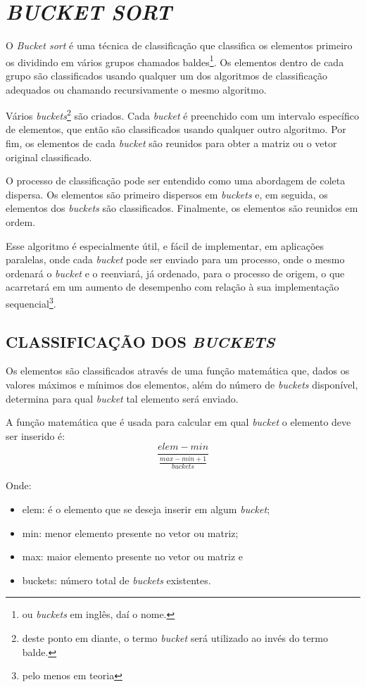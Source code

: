 \section{\normalsize \textit{BUCKET SORT}}
	O \textit{Bucket sort} é uma técnica de classificação que classifica os elementos primeiro os dividindo em vários grupos chamados baldes\footnote{ou \textit{buckets} em inglês, daí o nome.}. Os elementos dentro de cada grupo são classificados usando qualquer um dos algoritmos de classificação adequados ou chamando recursivamente o mesmo algoritmo.

Vários \textit{buckets}\footnote{deste ponto em diante, o termo \textit{bucket} será utilizado ao invés do termo balde.} são criados. Cada \textit{bucket} é preenchido com um intervalo específico de elementos, que então são  classificados usando qualquer outro algoritmo. Por fim, os elementos de cada \textit{bucket} são reunidos para obter a matriz ou o vetor original classificado.

O processo de classificação pode ser entendido como uma abordagem de coleta dispersa. Os elementos são primeiro dispersos em \textit{buckets} e, em seguida, os elementos dos \textit{buckets} são classificados. Finalmente, os elementos são reunidos em ordem.

Esse algoritmo é especialmente útil, e fácil de implementar, em aplicações paralelas, onde cada \textit{bucket} pode ser enviado para um processo, onde o mesmo ordenará o \textit{bucket} e o reenviará, já ordenado, para o processo de origem, o que acarretará em um aumento de desempenho com relação à sua implementação sequencial\footnote{pelo menos em teoria}.

	\subsection{\normalsize CLASSIFICAÇÃO DOS \textit{BUCKETS}}
		Os elementos são classificados através de uma função matemática que, dados os valores máximos e mínimos dos elementos, além do número de \textit{buckets} disponível, determina para qual \textit{bucket} tal elemento será enviado.
		
		A função matemática que é usada para calcular em qual \textit{bucket} o elemento deve ser inserido é:
		$$\frac{elem - min}{\frac{max - min + 1}{buckets}}$$
		
		Onde:
		\begin{itemize}
			\item elem: é o elemento que se deseja inserir em algum \textit{bucket};
			\item min: menor elemento presente no vetor ou matriz;
			\item max: maior elemento presente no vetor ou matriz e
			\item buckets: número total de \textit{buckets} existentes.
		\end{itemize}
	
